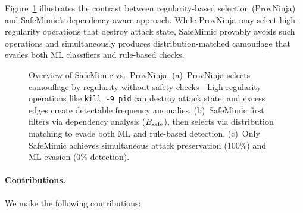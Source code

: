 Figure~\ref{fig:hero} illustrates the contrast between regularity-based selection (ProvNinja) and SafeMimic's dependency-aware approach.
While ProvNinja may select high-regularity operations that destroy attack state, SafeMimic provably avoids such operations and simultaneously produces distribution-matched camouflage that evades both ML classifiers and rule-based checks.

\begin{figure}[t]
    \centering
    \caption{Overview of SafeMimic vs.\ ProvNinja. (a)~ProvNinja selects camouflage by regularity without safety checks---high-regularity operations like \texttt{kill -9 \textlangle pid\textrangle} can destroy attack state, and excess edges create detectable frequency anomalies. (b)~SafeMimic first filters via dependency analysis ($B_{\text{safe}}$), then selects via distribution matching to evade both ML and rule-based detection. (c)~Only SafeMimic achieves simultaneous attack preservation (100\%) and ML evasion (0\% detection).}
    \label{fig:hero}
\end{figure}

\paragraph{Contributions.}
We make the following contributions:

